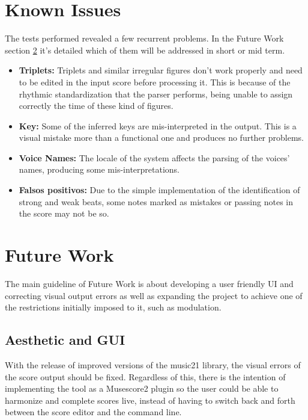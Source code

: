   \section{Known Issues}
  \label{sec:known_issues}
  The tests performed revealed a few recurrent problems. In the Future Work section \ref{sec:future_work} it's detailed which of them will be addressed in short or mid term.
  
  \begin{itemize}
  		\item \textbf{Triplets:} Triplets and similar irregular figures don't work properly and need to be edited in the input score before processing it. This is because of the rhythmic standardization that the parser performs, being unable to assign correctly the time of these kind of figures.
  		\item \textbf{Key:} Some of the inferred keys are mis-interpreted in the output. This is a visual mistake more than a functional one and produces no further problems.
  		\item \textbf{Voice Names:} The locale of the system affects the parsing of the voices' names, producing some mis-interpretations.
  		\item \textbf{Falsos positivos:} Due to the simple implementation of the identification of strong and weak beats, some notes marked as mistakes or passing notes in the score may not be so.
  \end{itemize}
  
  \section{Future Work}
  \label{sec:future_work}
  The main guideline of Future Work is about developing a user friendly UI and correcting visual output errors as well as expanding the project to achieve one of the restrictions initially imposed to it, such as modulation.
 
  \subsection{Aesthetic and GUI}
  \label{subsec:look_interface}
	With the release of improved versions of the music21 library, the visual errors of the score output should be fixed. Regardless of this, there is the intention of implementing the tool as a Musescore2 plugin so the user could be able to harmonize and complete scores live, instead of having to switch back and forth between the score editor and the command line. 
  
